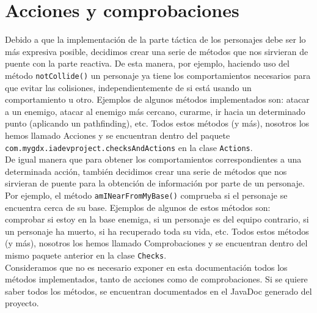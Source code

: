 \medskip
\section{Acciones y comprobaciones}
Debido a que la implementación de la parte táctica de los personajes debe ser lo más expresiva posible, decidimos crear una serie de métodos que nos sirvieran de puente con la parte reactiva. De esta manera, por ejemplo, haciendo uso del método \texttt{notCollide()} un personaje ya tiene los comportamientos necesarios para que evitar las colisiones, independientemente de si está usando un comportamiento u otro. Ejemplos de algunos métodos implementados son: atacar a un enemigo, atacar al enemigo más cercano, curarme, ir hacia un determinado punto (aplicando un pathfinding), etc. Todos estos métodos (y más), nosotros los hemos llamado Acciones y se encuentran dentro del paquete \texttt{com.mygdx.iadevproject.checksAndActions} en la clase \texttt{Actions}. \\

De igual manera que para obtener los comportamientos correspondientes a una determinada acción, también decidimos crear una serie de métodos que nos sirvieran de puente para la obtención de información por parte de un personaje. Por ejemplo, el método \texttt{amINearFromMyBase()}
comprueba si el personaje se encuentra cerca de su base. Ejemplos de algunos de estos métodos son: comprobar si estoy en la base enemiga, si un personaje es del equipo contrario, si un personaje ha muerto, si ha recuperado toda su vida, etc. Todos estos métodos (y más), nosotros los hemos llamado Comprobaciones y se encuentran dentro del mismo paquete anterior en la clase \texttt{Checks}. \\

Consideramos que no es necesario exponer en esta documentación todos los métodos implementados, tanto de acciones como de comprobaciones. Si se quiere saber todos los métodos, se encuentran documentados en el JavaDoc generado del proyecto.
